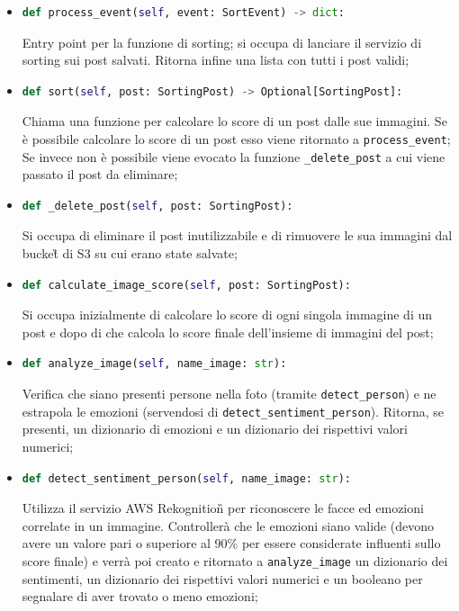 \begin{itemize}
	\item 
	\begin{lstlisting}[language=Python, numbers=none]
def process_event(self, event: SortEvent) -> dict:
	\end{lstlisting}
Entry point per la funzione di sorting; si occupa di lanciare il servizio di sorting sui post salvati. Ritorna infine una lista con tutti i post validi;
	\item 
	\begin{lstlisting}[language=Python, numbers=none]
def sort(self, post: SortingPost) -> Optional[SortingPost]:
	\end{lstlisting}
Chiama una funzione per calcolare lo score di un post dalle sue immagini. Se è possibile calcolare lo score di un post esso viene ritornato a \verb+process_event+; Se invece non è possibile viene evocato la funzione \verb+_delete_post+ a cui viene passato il post da eliminare;
	\item 
	\begin{lstlisting}[language=Python, numbers=none]
def _delete_post(self, post: SortingPost):
	\end{lstlisting}		
Si occupa di eliminare il post inutilizzabile e di rimuovere le sua immagini dal bucket\G{} di S3 su cui erano state salvate;
	\item 
	\begin{lstlisting}[language=Python, numbers=none]
def calculate_image_score(self, post: SortingPost):
	\end{lstlisting}	
Si occupa inizialmente di calcolare lo score di ogni singola immagine di un post e dopo di che calcola lo score finale dell'insieme di immagini del post;
	\item
	\begin{lstlisting}[language=Python, numbers=none]
def analyze_image(self, name_image: str):
	\end{lstlisting}	
Verifica che siano presenti persone nella foto (tramite \verb+detect_person+) e ne estrapola le emozioni (servendosi di \verb+detect_sentiment_person+). Ritorna, se presenti, un dizionario di emozioni e un dizionario dei rispettivi valori numerici;
	\item 
	\begin{lstlisting}[language=Python, numbers=none]
def detect_sentiment_person(self, name_image: str):
	\end{lstlisting}	
Utilizza il servizio AWS Rekognition\G{} per riconoscere le facce ed emozioni correlate in un immagine. Controllerà che le emozioni siano valide (devono avere un valore pari o superiore al 90\% per essere considerate influenti sullo score finale) e verrà poi creato e ritornato a \verb+analyze_image+ un dizionario dei sentimenti, un dizionario dei rispettivi valori numerici e un booleano per segnalare di aver trovato o meno emozioni;

\end{itemize}
